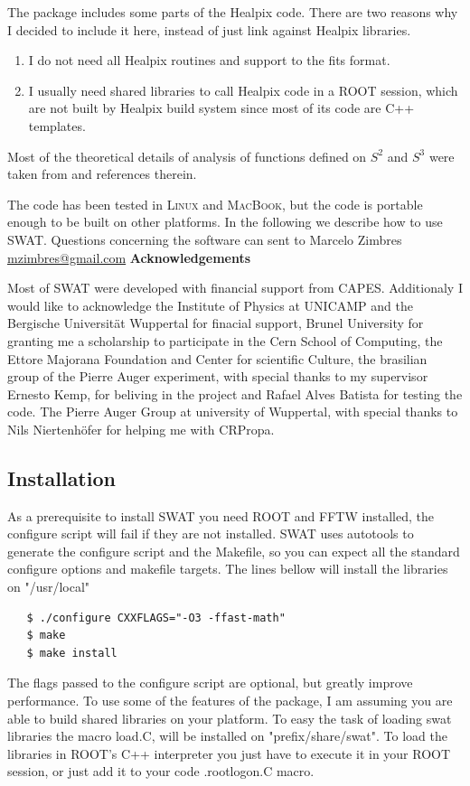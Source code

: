 \documentclass[12pt]{article}
\begin{document}
The package includes some parts of the Healpix code. There are two reasons why
I decided to include it here, instead of just link against Healpix libraries.
\begin{enumerate}
\item I do not need all Healpix routines and support to the fits format. 
\item I usually need shared libraries to call Healpix code in a ROOT session,
which are not built by Healpix build system since most of its code are C++
templates.
\end{enumerate}

Most of the theoretical details of analysis of functions defined on $S^2$ and $S^3$ 
were taken from \cite{wiaux} and references therein. 

The code has been tested in \textsc{Linux} and \textsc{MacBook}, but the code
is portable enough to be built on other platforms.  In the following we
describe how to use SWAT. Questions concerning the software can sent to Marcelo
Zimbres \href{mailto:mzimbres@gmail.com}{mzimbres@gmail.com}
\vspace{0.7cm}
\newline
{\bf \large Acknowledgements}
\vspace{0.7cm}

Most of SWAT were developed with financial support from CAPES.  Additionaly I
would like to acknowledge the Institute of Physics at UNICAMP and the Bergische
Universit\"at Wuppertal for finacial support, Brunel University for granting me a
scholarship to participate in the Cern School of Computing, the Ettore Majorana
Foundation and Center for scientific Culture, the brasilian group of the Pierre
Auger experiment, with special thanks to my supervisor Ernesto Kemp, for
beliving in the project and Rafael Alves Batista for testing the code. The
Pierre Auger Group at university of Wuppertal, with special thanks to Nils
Niertenh\"ofer for helping me with CRPropa.

\subsection{Installation} \label{ch::installation}
As a prerequisite to install SWAT you need ROOT and FFTW installed, the
configure script will fail if they are not installed. SWAT uses autotools to
generate the configure script and the Makefile, so you can expect all the
standard configure options and makefile targets. The lines bellow will install
the libraries on {\color{brown}"/usr/local"}
{\bf \color{brown}
   \begin{lstlisting}
   $ ./configure CXXFLAGS="-O3 -ffast-math"
   $ make
   $ make install
   \end{lstlisting}
}
The flags passed to the configure script are optional, but greatly improve performance.
To use some of the features of the package, I am assuming you are able to build
shared libraries on your platform. To easy the task of loading swat libraries
the macro load.C, will be installed on
{\color{brown}"prefix/share/swat"}. To load the libraries in ROOT's C++
interpreter you just have to execute it in your ROOT session, or just add it to
your code {\color{brown}.rootlogon.C} macro.
\end{document}
